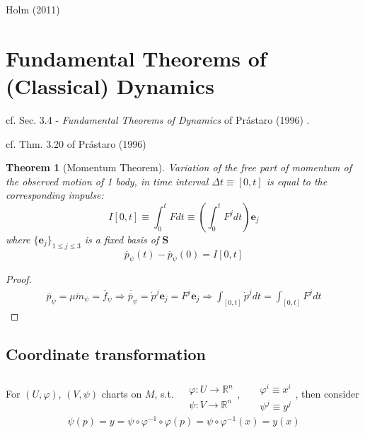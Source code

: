 \documentclass[10pt]{amsart}
\newtheorem{theorem}{Theorem}
\begin{document}
\begin{multicols*}{2}
Holm (2011) \cite{Holm2011}


\section{Fundamental Theorems of (Classical) Dynamics}

cf. Sec. 3.4 - \emph{Fundamental Theorems of Dynamics} of Pr\'{a}staro (1996) \cite{Pras1996}.

cf. Thm. 3.20 of Pr\'{a}staro (1996) \cite{Pras1996}
\begin{theorem}[Momentum Theorem]
	Variation of the free part of momentum of the observed motion of 1 body, in time interval $\Delta t \equiv [0, t]$ is equal to the corresponding impulse:
	\begin{equation}
	I[0,t] \equiv \int_0^t Fdt \equiv \left( \int_0^t F^j dt \right) \mathbf{e}_j
	\end{equation}
	where $\lbrace \mathbf{e}_j \rbrace_{1 \leq j \leq 3}$ is a fixed basis of $\mathbf{S}$
	\begin{equation}
		\overline{p}_{\psi}(t) - \overline{p}_{\psi}(0) = I[0,t]
	\end{equation}
\end{theorem}

\begin{proof}
	\[
\begin{gathered}
\overline{p}_{\psi} = \mu \ddot{m}_{\psi} = \overline{f}_{\psi} \Longrightarrow \dot{ \overline{p}_{\psi}} = \dot{p}^j \mathbf{e}_j = F^j \textbf{e}_j \Longrightarrow \int_{[0,t]} \dot{p}^j dt = \int_{[0,t]}F^j dt
\end{gathered}
	\]
	\end{proof}

\subsection{Coordinate transformation}

For $(U, \varphi)$, $(V, \psi)$ charts on $M$, s.t. $\begin{aligned} & \quad \\ 
	& \varphi : U \to \mathbb{R}^n \\
	 & \psi: V \to \mathbb{R}^n \end{aligned}$, \quad \, $\begin{aligned} & \quad \\ 
	 & \varphi^i \equiv x^i \\
	 & \psi^j \equiv y^j \end{aligned}$, then consider 
\[
\begin{gathered}
\psi(p) = y = \psi \circ \varphi^{-1} \circ \varphi(p) = \psi \circ \varphi^{-1}(x) = y(x)
\end{gathered}  
\]


\end{multicols*}
\end{document}
